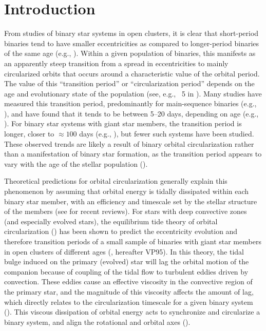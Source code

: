 \documentclass[modern, letterpaper]{aastex62}
\begin{document}

\section{Introduction} \label{sec:intro}

From studies of binary star systems in open clusters, it is clear that
short-period binaries tend to have smaller eccentricities as compared to
longer-period binaries of the same age (e.g., \citealt{Mathieu:2005}).
Within a given population of binaries, this manifests as an apparently steep transition from a spread in eccentricities to mainly circularized orbits that occurs around a characteristic value of the orbital period.
The value of this ``transition period'' or ``circularization period'' depends on the age and evolutionary state of the population (see, e.g., \figurename~5 in \citealt{Mathieu:2005}).
Many studies have measured this transition period, predominantly for main-sequence binaries (e.g., \citealt{Latham:2002, Meibom:2006, Kjurkchieva:2017}), and have found that it tends to be between 5--20 days, depending on age (e.g., \citealt{Mathieu:1988}).
For binary star systems with giant star members, the transition period is longer, closer to $\approx 100$ days (e.g., \citealt{Mayor:1984, Bluhm:2016}), but fewer such systems have been studied.
These observed trends are likely a result of binary orbital circularization rather than a manifestation of binary star formation, as the transition period appears to vary with the age of the stellar population (\citealt{Meibom:2005}).

Theoretical predictions for orbital circularization generally explain this phenomenon by assuming that orbital energy is tidally dissipated within each binary star member, with an efficiency and timescale set by the stellar structure of the members (see \citealt{Mazeh:2007hp, Zahn:2008} for recent reviews).
For stars with deep convective zones (and especially evolved stars), the equilibrium tide theory of orbital circularization (\citealt{Zahn:1977, Zahn:1989}) has been shown to predict the eccentricity evolution and therefore transition periods of a small sample of binaries with giant star members in open clusters of different ages (\citealt{Verbunt:1995}, hereafter VP95).
In this theory, the tidal bulge induced on the primary (evolved) star will lag
the orbital motion of the companion because of coupling of the tidal flow to
turbulent eddies driven by convection.
These eddies cause an effective viscosity in the convective region of the
primary star, and the magnitude of this viscosity affects the amount of lag,
which directly relates to the circularization timescale for a given binary
system (\citealt{Zahn:1989}).
This viscous dissipation of orbital energy acts to synchronize and circularize a
binary system, and align the rotational and orbital axes (\citealt{Zahn:1977,
Zahn:1989}).
\end{document}
